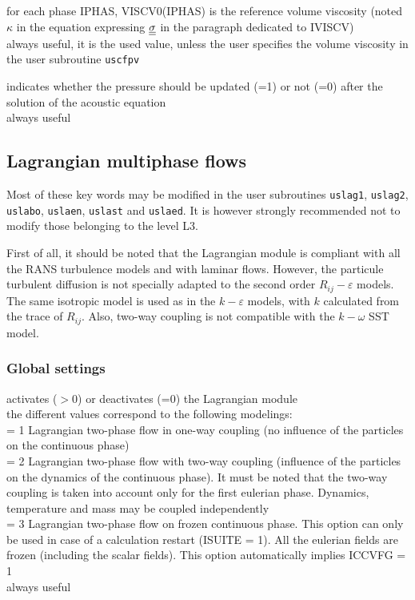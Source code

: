 {for each phase IPHAS, VISCV0(IPHAS) is the reference volume viscosity
(noted $\kappa$ in the equation expressing $\underline{\underline{\sigma}}$ in the
paragraph dedicated to IVISCV)\\
always useful, it is the used value, unless the user specifies the volume
viscosity in the user subroutine \texttt{uscfpv}}

{indicates whether the pressure should be updated (=1) or not (=0) after the
solution of the acoustic equation\\
always useful}

\subsection{Lagrangian multiphase flows}
\label{prg_motscles_lagr}

Most of these key words may be modified in the user subroutines
\texttt{uslag1}, \texttt{uslag2}, \texttt{uslabo}, \texttt{uslaen},
\texttt{uslast} and \texttt{uslaed}. It is however strongly recommended
not to modify those belonging to the level L3.

First of all, it should be noted that the Lagrangian module is compliant with
all the RANS turbulence models and with laminar flows. However, the particule
turbulent diffusion is not specially adapted to the second order
$R_{ij}-\varepsilon$ models. The same isotropic model is used as in the
$k-\varepsilon$ models, with $k$ calculated from the trace of $R_{ij}$. Also,
two-way coupling is not compatible with the $k-\omega$ SST model.


\subsubsection{Global settings}

{activates ($>$0) or deactivates (=0) the Lagrangian module\\
the different values correspond to the following modelings: \\
\hspace*{1.3cm} = 1 Lagrangian two-phase flow in one-way coupling (no influence of
the particles on the continuous phase)\\
\hspace*{1.3cm} = 2 Lagrangian two-phase flow with two-way coupling (influence of
the particles on the dynamics of the continuous phase).
It must be noted that the two-way coupling is taken
into account only for the first eulerian phase. Dynamics,
temperature and mass may be coupled independently\\
\hspace*{1.3cm} = 3 Lagrangian two-phase flow on frozen continuous phase. This option can
only be used in case of a calculation restart (ISUITE = 1). All the eulerian
fields are frozen (including the scalar fields). This option automatically
implies ICCVFG = 1\\
always useful}

